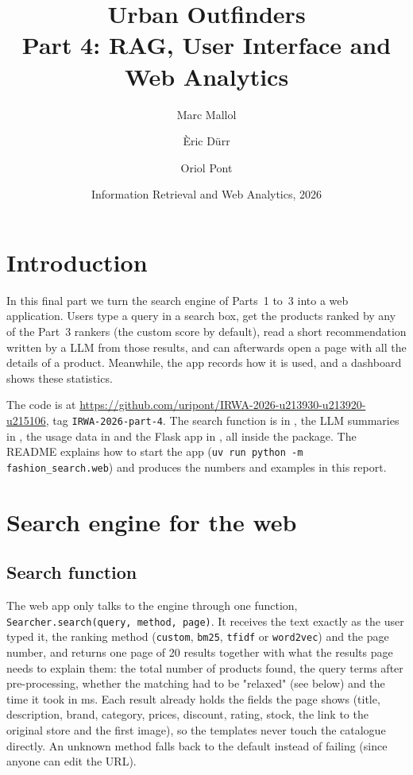 \documentclass[11pt,a4paper]{article}
\title{Urban Outfinders\\[0.3em]\large Part 4: RAG, User Interface and Web Analytics}
\author{Marc Mallol\and Èric Dürr\and Oriol Pont}
\date{Information Retrieval and Web Analytics, 2026}
\begin{document}
\maketitle

\section{Introduction}

In this final part we turn the search engine of Parts~1 to~3 into a web application. Users type a query in a search box, get the products ranked by any of the Part~3 rankers (the custom score by default), read a short recommendation written by a LLM from those results, and can afterwards open a page with all the details of a product. Meanwhile, the app records how it is used, and a dashboard shows these statistics.

The code is at \url{https://github.com/uripont/IRWA-2026-u213930-u213920-u215106}, tag \texttt{IRWA-2026-part-4}. The search function is in , the LLM summaries in , the usage data in  and the Flask app in , all inside the  package. The README explains how to start the app (\texttt{uv run python -m fashion\_search.web}) and  produces the numbers and examples in this report.

\section{Search engine for the web}
\subsection{Search function}

The web app only talks to the engine through one function, \texttt{Searcher.search(query, method, page)}. It receives the text exactly as the user typed it, the ranking method (\texttt{custom}, \texttt{bm25}, \texttt{tfidf} or \texttt{word2vec}) and the page number, and returns one page of 20 results together with what the results page needs to explain them: the total number of products found, the query terms after pre-processing, whether the matching had to be "relaxed" (see below) and the time it took in ms. Each result already holds the fields the page shows (title, description, brand, category, prices, discount, rating, stock, the link to the original store and the first image), so the templates never touch the catalogue directly. An unknown method falls back to the default instead of failing (since anyone can edit the URL).
\end{document}
